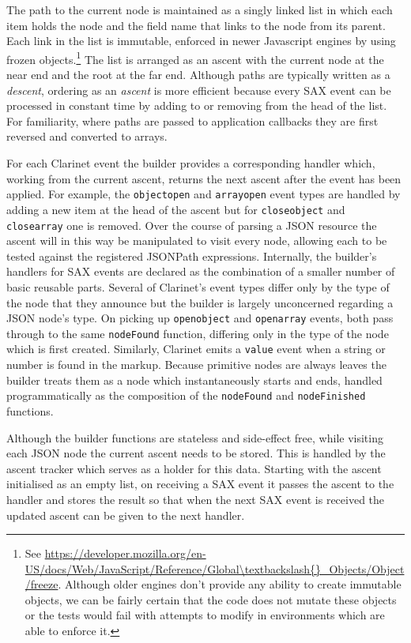 \documentclass[]{article}
\begin{document}
The path to the current node is maintained as a singly linked list in
which each item holds the node and the field name that links to the node
from its parent. Each link in the list is immutable, enforced in newer
Javascript engines by using frozen objects.\footnote{See
  \url{https://developer.mozilla.org/en-US/docs/Web/JavaScript/Reference/Global\textbackslash{}_Objects/Object/freeze}.
  Although older engines don't provide any ability to create immutable
  objects, we can be fairly certain that the code does not mutate these
  objects or the tests would fail with attempts to modify in
  environments which are able to enforce it.} The list is arranged as an
ascent with the current node at the near end and the root at the far
end. Although paths are typically written as a \emph{descent}, ordering
as an \emph{ascent} is more efficient because every SAX event can be
processed in constant time by adding to or removing from the head of the
list. For familiarity, where paths are passed to application callbacks
they are first reversed and converted to arrays.

For each Clarinet event the builder provides a corresponding handler
which, working from the current ascent, returns the next ascent after
the event has been applied. For example, the \texttt{objectopen} and
\texttt{arrayopen} event types are handled by adding a new item at the
head of the ascent but for \texttt{closeobject} and \texttt{closearray}
one is removed. Over the course of parsing a JSON resource the ascent
will in this way be manipulated to visit every node, allowing each to be
tested against the registered JSONPath expressions. Internally, the
builder's handlers for SAX events are declared as the combination of a
smaller number of basic reusable parts. Several of Clarinet's event
types differ only by the type of the node that they announce but the
builder is largely unconcerned regarding a JSON node's type. On picking
up \texttt{openobject} and \texttt{openarray} events, both pass through
to the same \texttt{nodeFound} function, differing only in the type of
the node which is first created. Similarly, Clarinet emits a
\texttt{value} event when a string or number is found in the markup.
Because primitive nodes are always leaves the builder treats them as a
node which instantaneously starts and ends, handled programmatically as
the composition of the \texttt{nodeFound} and \texttt{nodeFinished}
functions.

Although the builder functions are stateless and side-effect free, while
visiting each JSON node the current ascent needs to be stored. This is
handled by the ascent tracker which serves as a holder for this data.
Starting with the ascent initialised as an empty list, on receiving a
SAX event it passes the ascent to the handler and stores the result so
that when the next SAX event is received the updated ascent can be given
to the next handler.
\end{document}

